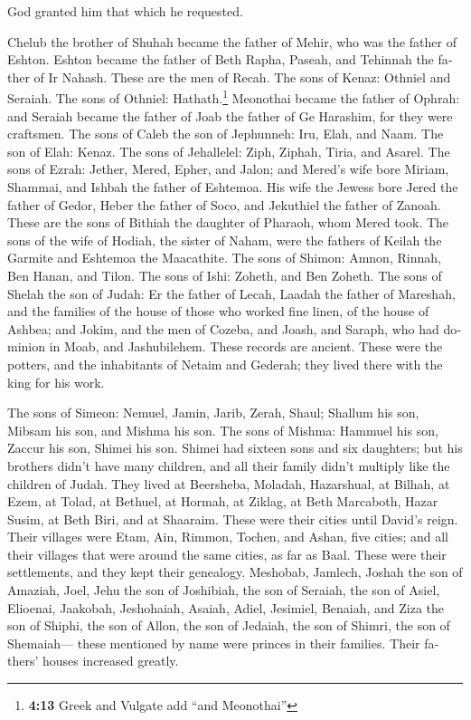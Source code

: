 \begin{paracol}{2}
\begin{otherlanguage}{english}
God granted him that which he requested.

 Chelub the brother of Shuhah became the father of Mehir,
who was the father of Eshton.  Eshton became the father
of Beth Rapha, Paseah, and Tehinnah the father of Ir Nahash. These are
the men of Recah.  The sons of Kenaz: Othniel and
Seraiah. The sons of Othniel: Hathath.\footnote{\textbf{4:13} Greek and
  Vulgate add ``and Meonothai''}  Meonothai became the
father of Ophrah: and Seraiah became the father of Joab the father of Ge
Harashim, for they were craftsmen.  The sons of Caleb the
son of Jephunneh: Iru, Elah, and Naam. The son of Elah: Kenaz.
 The sons of Jehallelel: Ziph, Ziphah, Tiria, and Asarel.
 The sons of Ezrah: Jether, Mered, Epher, and Jalon; and
Mered's wife bore Miriam, Shammai, and Ishbah the father of Eshtemoa.
 His wife the Jewess bore Jered the father of Gedor,
Heber the father of Soco, and Jekuthiel the father of Zanoah. These are
the sons of Bithiah the daughter of Pharaoh, whom Mered took.
 The sons of the wife of Hodiah, the sister of Naham,
were the fathers of Keilah the Garmite and Eshtemoa the Maacathite.
 The sons of Shimon: Amnon, Rinnah, Ben Hanan, and Tilon.
The sons of Ishi: Zoheth, and Ben Zoheth.  The sons of
Shelah the son of Judah: Er the father of Lecah, Laadah the father of
Mareshah, and the families of the house of those who worked fine linen,
of the house of Ashbea;  and Jokim, and the men of
Cozeba, and Joash, and Saraph, who had dominion in Moab, and
Jashubilehem. These records are ancient.  These were the
potters, and the inhabitants of Netaim and Gederah; they lived there
with the king for his work.

 The sons of Simeon: Nemuel, Jamin, Jarib, Zerah, Shaul;
 Shallum his son, Mibsam his son, and Mishma his son.
 The sons of Mishma: Hammuel his son, Zaccur his son,
Shimei his son.  Shimei had sixteen sons and six
daughters; but his brothers didn't have many children, and all their
family didn't multiply like the children of Judah.  They
lived at Beersheba, Moladah, Hazarshual,  at Bilhah, at
Ezem, at Tolad,  at Bethuel, at Hormah, at Ziklag,
 at Beth Marcaboth, Hazar Susim, at Beth Biri, and at
Shaaraim. These were their cities until David's reign. 
Their villages were Etam, Ain, Rimmon, Tochen, and Ashan, five cities;
 and all their villages that were around the same cities,
as far as Baal. These were their settlements, and they kept their
genealogy.  Meshobab, Jamlech, Joshah the son of Amaziah,
 Joel, Jehu the son of Joshibiah, the son of Seraiah, the
son of Asiel,  Elioenai, Jaakobah, Jeshohaiah, Asaiah,
Adiel, Jesimiel, Benaiah,  and Ziza the son of Shiphi,
the son of Allon, the son of Jedaiah, the son of Shimri, the son of
Shemaiah---  these mentioned by name were princes in
their families. Their fathers' houses increased greatly.


\end{otherlanguage}
\end{paracol}
